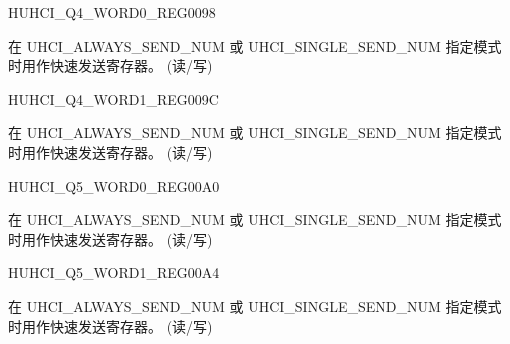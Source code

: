 \begin{register}{H}{UHCI\_Q4\_WORD0\_REG}{\hexprefix{}0098}\label{regdesc:UHCIQ4WORD0REG}
%
\regnewline%
\begin{regdesc}\begin{reglist}
\label{fielddesc:UHCISENDQ4WORD0}\item [UHCI\_SEND\_Q4\_WORD0] 在 UHCI\_ALWAYS\_SEND\_NUM 或 UHCI\_SINGLE\_SEND\_NUM 指定模式时用作快速发送寄存器。 (读/写)
\end{reglist}\end{regdesc}
\end{register}


\begin{register}{H}{UHCI\_Q4\_WORD1\_REG}{\hexprefix{}009C}\label{regdesc:UHCIQ4WORD1REG}
%
\regnewline%
\begin{regdesc}\begin{reglist}
\label{fielddesc:UHCISENDQ4WORD1}\item [UHCI\_SEND\_Q4\_WORD1] 在 UHCI\_ALWAYS\_SEND\_NUM 或 UHCI\_SINGLE\_SEND\_NUM 指定模式时用作快速发送寄存器。 (读/写)
\end{reglist}\end{regdesc}
\end{register}


\begin{register}{H}{UHCI\_Q5\_WORD0\_REG}{\hexprefix{}00A0}\label{regdesc:UHCIQ5WORD0REG}
%
\regnewline%
\begin{regdesc}\begin{reglist}
\label{fielddesc:UHCISENDQ5WORD0}\item [UHCI\_SEND\_Q5\_WORD0] 在 UHCI\_ALWAYS\_SEND\_NUM 或 UHCI\_SINGLE\_SEND\_NUM 指定模式时用作快速发送寄存器。 (读/写)
\end{reglist}\end{regdesc}
\end{register}


\begin{register}{H}{UHCI\_Q5\_WORD1\_REG}{\hexprefix{}00A4}\label{regdesc:UHCIQ5WORD1REG}
%
\regnewline%
\begin{regdesc}\begin{reglist}
\label{fielddesc:UHCISENDQ5WORD1}\item [UHCI\_SEND\_Q5\_WORD1] 在 UHCI\_ALWAYS\_SEND\_NUM 或 UHCI\_SINGLE\_SEND\_NUM 指定模式时用作快速发送寄存器。 (读/写)
\end{reglist}\end{regdesc}
\end{register}


